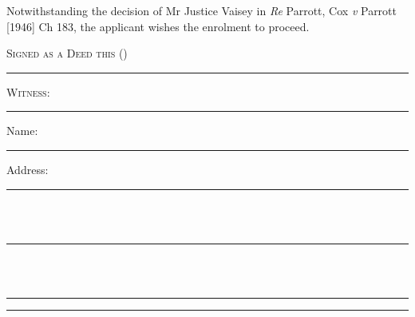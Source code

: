 \documentclass[10pt, twoside, a4paper]{article}
\begin{document}
\vspace{10pt}

\noindent Notwithstanding the decision of Mr Justice Vaisey in \textit{Re} Parrott, Cox
\textit{v} Parrott [1946] Ch 183, the applicant wishes the enrolment to proceed.

\vspace{2pt}

{
	\scshape
	\noindent Signed as a Deed this \worddate  \space (\numberdate)
}

\vspace{48pt}

\begin{multicols}{2}

	\par\noindent\hrule
	\vspace{14pt}

	{
		\centering
		\noindent
		\textbf{\scshape{\newname}}
		\par
	}

	\vspace{48pt}

	{\scshape \noindent Witness:}

	\vspace{48pt}
	\par\noindent\hrule
	\vspace{14pt}

	{
		\scshape

		\noindent Name: \\
		\noindent\hspace*{4em}\rule{0.35\textwidth}{0.5pt}

		\vspace{12pt}

		\noindent Address:

		\noindent\hspace*{4em}\rule{0.35\textwidth}{0.5pt} \\ \\
		\noindent\hspace*{4em}\rule{0.35\textwidth}{0.5pt} \\ \\
		\noindent\hspace*{4em}\rule{0.35\textwidth}{0.5pt}
	}

	\columnbreak

	\par\noindent\hrule
	\vspace{14pt}

	{
		\centering
		\noindent
        \textbf{\scshape{\oldname}}
		\par
	}


\end{multicols}
\end{document}
